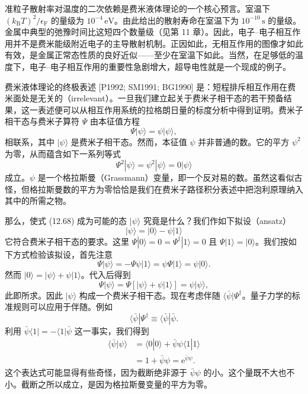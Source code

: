 准粒子散射率对温度的二次依赖是费米液体理论的一个核心预言。室温下 $(k_{\mathrm B}T)^2/\epsilon_{\mathrm F}$ 的量级为 $10^{-4}\,\mathrm{eV}$。由此给出的散射寿命在室温下为 $10^{-10}\,\mathrm{s}$ 的量级。金属中典型的弛豫时间比这短四个数量级（见第 11 章）。因此，电子–电子相互作用并不是费米能级附近电子的主导散射机制。正因如此，无相互作用的图像才如此有效，是金属正常态性质的良好近似——至少在室温下如此。当然，在足够低的温度下，电子–电子相互作用的重要性急剧增大，超导电性就是一个现成的例子。

费米液体理论的终极表述 [P1992; SM1991; BG1990] 是：短程排斥相互作用在费米面处是无关的（irrelevant）。一旦我们建立起关于费米子相干态的若干预备结果，这一表述便可以从相互作用系统的拉格朗日量的标度分析中得到证明。费米子相干态与费米子算符 $\Psi$ 由本征值方程
\begin{equation*}
\Psi|\psi\rangle=\psi|\psi\rangle, \tag{12.68}
\end{equation*}
相联系，其中 $|\psi\rangle$ 是费米子相干态。然而，本征值 $\psi$ 并非普通的数。它的平方 $\psi^2$ 为零，从而蕴含如下一系列等式
\begin{equation*}
\Psi^2|\psi\rangle=\psi^2|\psi\rangle=0|\psi\rangle \tag{12.69}
\end{equation*}
成立。$\psi$ 是一个格拉斯曼（Grassmann）变量，即一个反对易的数。虽然这看似古怪，但格拉斯曼数的平方为零恰恰是我们在费米子路径积分表述中把泡利原理纳入其中的所需之物。

那么，使式 (12.68) 成为可能的态 $|\psi\rangle$ 究竟是什么？我们作如下拟设（ansatz）
\begin{equation*}
|\psi\rangle=|0\rangle-\psi|1\rangle \tag{12.70}
\end{equation*}
它符合费米子相干态的要求。这里 $\Psi|0\rangle=0=\Psi^\dagger|1\rangle=0$ 且 $\Psi|1\rangle=|0\rangle$。我们按如下方式检验该拟设，首先注意
\begin{equation*}
\Psi|\psi\rangle=-\Psi\psi|1\rangle=\psi\Psi|1\rangle=\psi|0\rangle. \tag{12.71}
\end{equation*}
然而 $|0\rangle=|\psi\rangle+\psi|1\rangle$。代入后得到
\begin{equation*}
\Psi|\psi\rangle=\Psi\left[|\psi\rangle+\psi|1\rangle\right]=\psi|\psi\rangle, \tag{12.72}
\end{equation*}
此即所求。因此 $|\psi\rangle$ 构成一个费米子相干态。现在考虑伴随 $\langle\bar\psi|\Psi^\dagger$。量子力学的标准规则可以应用于伴随。例如
\begin{equation*}
\langle\bar\psi|\Psi^\dagger\equiv\langle\bar\psi|\bar\psi. \tag{12.73}
\end{equation*}
利用 $\bar\psi\langle 1|=-\langle 1|\bar\psi$ 这一事实，我们得到
\begin{align*}
\langle\bar\psi|\psi\rangle&=\langle 0|0\rangle+\bar\psi\psi\langle 1|1\rangle\\
&=1+\bar\psi\psi=\mathrm e^{\bar\psi\psi}. \tag{12.74}
\end{align*}
这个表达式可能显得有些奇怪，因为截断绝非源于 $\bar\psi\psi$ 的小。这个量既不大也不小。截断之所以成立，是因为格拉斯曼变量的平方为零。

